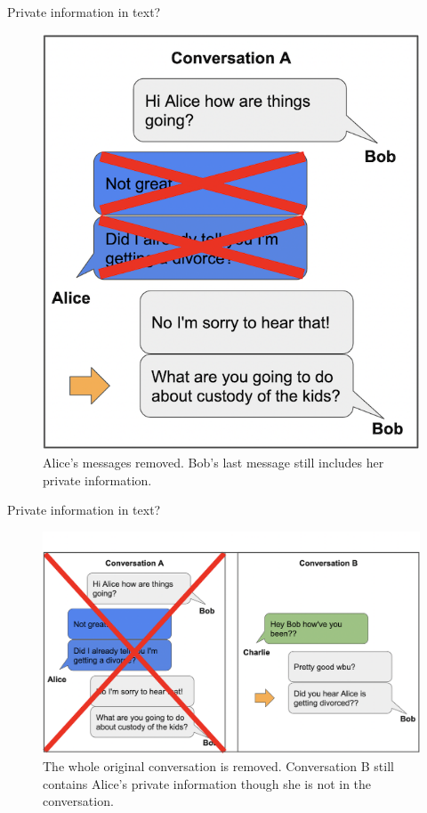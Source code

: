 \documentclass[12pt,aspectratio=169,handout]{beamer}
\begin{document}
\begin{frame}{Private information in text?}

\begin{figure}
\includegraphics[width=0.45\linewidth]{img/out2.png}
\caption{Alice's messages removed. Bob's last message still includes her private information.}
\end{figure}



\end{frame}


\begin{frame}{Private information in text?}

\begin{figure}
\includegraphics[width=0.75\linewidth]{img/out3.png}
\caption{The whole original conversation is removed. Conversation B still contains Alice's private information though she is not in the conversation.}
\end{figure}



\end{frame}
\end{document}
